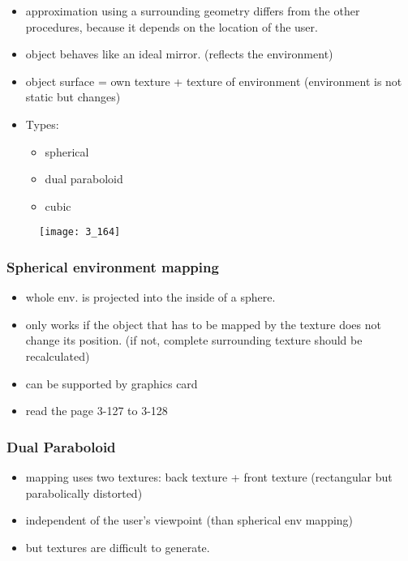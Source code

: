 \documentclass{standalone}
\begin{document}
\begin{itemize}
	\item approximation using a surrounding geometry differs from the other procedures, because it depends on the location of the user.
	\item object behaves like an ideal mirror. (reflects the environment)
	\item object surface = own texture + texture of environment (environment is not static but changes) 
	\item Types:
		\begin{itemize}
			\item spherical 
			\item dual paraboloid
			\item cubic
		\end{itemize}
\end{itemize}

\begin{figure}[H]
	\texttt{[image: 3\_164]}
\end{figure} 

\subsubsection*{Spherical environment mapping}

\begin{itemize}
	\item whole env. is projected into the inside of a sphere.
	\item only works if the object that has to be mapped by the texture does not change its position. (if not, complete surrounding texture should be recalculated)
	\item can be supported by graphics card 
	\item read the page 3-127 to 3-128
\end{itemize}

\subsubsection*{Dual Paraboloid}

\begin{itemize}
	\item mapping uses two textures: back texture + front texture (rectangular but parabolically distorted)
	\item independent of the user's viewpoint (than spherical env mapping)
	\item but textures are difficult to generate.
\end{itemize}
\end{document}
